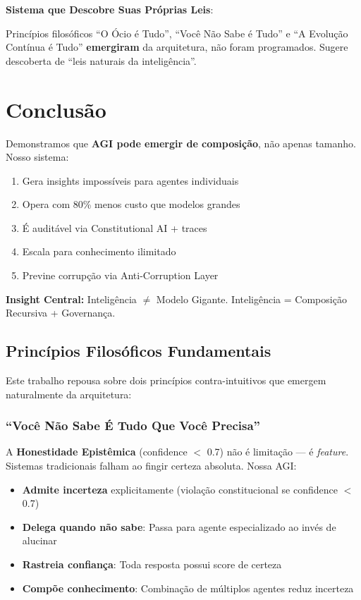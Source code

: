 \documentclass[11pt]{article}
\begin{document}
\textbf{Sistema que Descobre Suas Próprias Leis}:

Princípios filosóficos ``O Ócio é Tudo'', ``Você Não Sabe é Tudo'' e ``A Evolução Contínua é Tudo'' \textbf{emergiram} da arquitetura, não foram programados. Sugere descoberta de ``leis naturais da inteligência''.

\section{Conclusão}

Demonstramos que \textbf{AGI pode emergir de composição}, não apenas tamanho. Nosso sistema:

\begin{enumerate}
    \item Gera insights impossíveis para agentes individuais
    \item Opera com 80\% menos custo que modelos grandes
    \item É auditável via Constitutional AI + traces
    \item Escala para conhecimento ilimitado
    \item Previne corrupção via Anti-Corruption Layer
\end{enumerate}

\textbf{Insight Central:} Inteligência $\neq$ Modelo Gigante. Inteligência = Composição Recursiva + Governança.

\subsection{Princípios Filosóficos Fundamentais}

Este trabalho repousa sobre dois princípios contra-intuitivos que emergem naturalmente da arquitetura:

\subsubsection{``Você Não Sabe É Tudo Que Você Precisa''}

A \textbf{Honestidade Epistêmica} (confidence $<$ 0.7) não é limitação --- é \textit{feature}. Sistemas tradicionais falham ao fingir certeza absoluta. Nossa AGI:

\begin{itemize}
    \item \textbf{Admite incerteza} explicitamente (violação constitucional se confidence $<$ 0.7)
    \item \textbf{Delega quando não sabe}: Passa para agente especializado ao invés de alucinar
    \item \textbf{Rastreia confiança}: Toda resposta possui score de certeza
    \item \textbf{Compõe conhecimento}: Combinação de múltiplos agentes reduz incerteza
\end{itemize}
\end{document}
